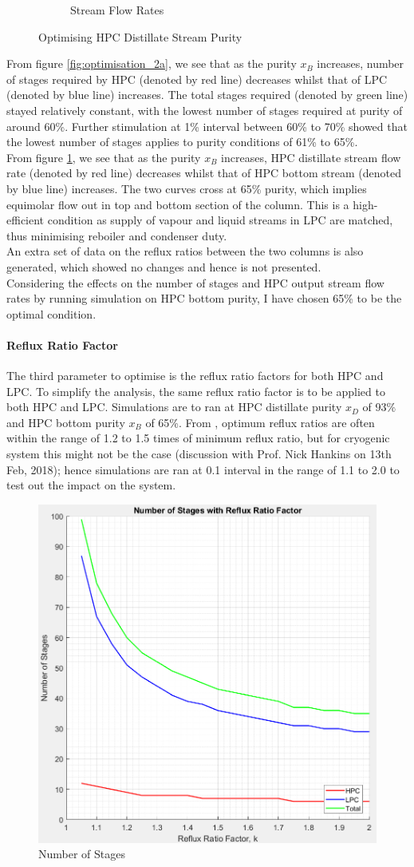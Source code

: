 \documentclass[11pt,oneside]{article}
\let\subsubsubsection\paragraph
\begin{document}
\begin{figure}[ht]
\begin{subfigure}{0.49\textwidth}
            \caption{Stream Flow Rates} \label{fig:optimisation_2b}
        \end{subfigure}
        \caption{Optimising HPC Distillate Stream Purity} \label{fig:optimsation_2}
    \end{figure}
	From figure \ref{fig:optimisation_2a}, we see that as the purity $x_B$ increases, number of stages required by HPC (denoted by red line) decreases whilst that of LPC (denoted by blue line) increases. The total stages required (denoted by green line) stayed relatively constant, with the lowest number of stages required at purity of around 60\%. Further stimulation at 1\% interval between 60\% to 70\% showed that the lowest number of stages applies to purity conditions of 61\% to 65\%. \\
	From figure \ref{fig:optimisation_2b}, we see that as the purity $x_B$ increases, HPC distillate stream flow rate (denoted by red line) decreases whilst that of HPC bottom stream (denoted by blue line) increases. The two curves cross at 65\% purity, which implies equimolar flow out in top and bottom section of the column. This is a high-efficient condition as supply of vapour and liquid streams in LPC are matched, thus minimising reboiler and condenser duty.\\
	An extra set of data on the reflux ratios between the two columns is also generated, which showed no changes and hence is not presented.\\
	Considering the effects on the number of stages and HPC output stream flow rates by running simulation on HPC bottom purity, I have chosen 65\% to be the optimal condition.
    \subsubsubsection{Reflux Ratio Factor}
    The third parameter to optimise is the reflux ratio factors for both HPC and LPC. To simplify the analysis, the same reflux ratio factor is to be applied to both HPC and LPC. Simulations are to ran at HPC distillate purity $x_D$ of 93\% and HPC bottom purity $x_B$ of 65\%. From \cite{treybal2004}, optimum reflux ratios are often within the range of 1.2 to 1.5 times of minimum reflux ratio, but for cryogenic system this might not be the case (discussion with Prof. Nick Hankins on 13th Feb, 2018); hence simulations are ran at 0.1 interval in the range of 1.1 to 2.0 to test out the impact on the system.
    \begin{figure}[H]
        \centering
        \includegraphics[width=0.45\linewidth]{graph-stages_vs_R.jpeg}
        \caption{Number of Stages}
        \label{fig:optimisation_3}
    \end{figure}
\end{document}
